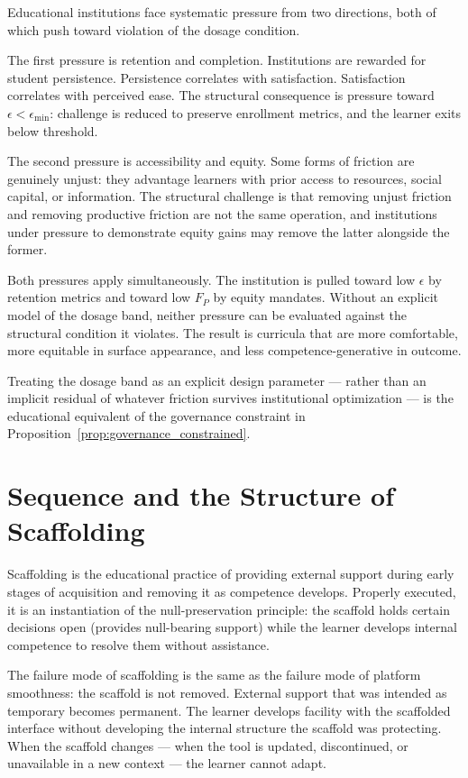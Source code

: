 \documentclass[11pt]{article}
\theoremstyle{remark}
\begin{document}
Educational institutions face systematic pressure from two directions, both of which push toward violation of the dosage condition.

The first pressure is retention and completion. Institutions are rewarded for student persistence. Persistence correlates with satisfaction. Satisfaction correlates with perceived ease. The structural consequence is pressure toward $\epsilon < \epsilon_{\min}$: challenge is reduced to preserve enrollment metrics, and the learner exits below threshold.

The second pressure is accessibility and equity. Some forms of friction are genuinely unjust: they advantage learners with prior access to resources, social capital, or information. The structural challenge is that removing unjust friction and removing productive friction are not the same operation, and institutions under pressure to demonstrate equity gains may remove the latter alongside the former.

Both pressures apply simultaneously. The institution is pulled toward low $\epsilon$ by retention metrics and toward low $F_P$ by equity mandates. Without an explicit model of the dosage band, neither pressure can be evaluated against the structural condition it violates. The result is curricula that are more comfortable, more equitable in surface appearance, and less competence-generative in outcome.

Treating the dosage band as an explicit design parameter --- rather than an implicit residual of whatever friction survives institutional optimization --- is the educational equivalent of the governance constraint in Proposition~\ref{prop:governance_constrained}.

\section{Sequence and the Structure of Scaffolding}
\label{sec:scaffolding}

Scaffolding is the educational practice of providing external support during early stages of acquisition and removing it as competence develops. Properly executed, it is an instantiation of the null-preservation principle: the scaffold holds certain decisions open (provides null-bearing support) while the learner develops internal competence to resolve them without assistance.

The failure mode of scaffolding is the same as the failure mode of platform smoothness: the scaffold is not removed. External support that was intended as temporary becomes permanent. The learner develops facility with the scaffolded interface without developing the internal structure the scaffold was protecting. When the scaffold changes --- when the tool is updated, discontinued, or unavailable in a new context --- the learner cannot adapt.
\end{document}
